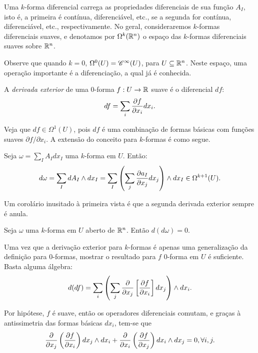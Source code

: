 Uma $k$-forma diferencial carrega as propriedades diferenciais de sua função $A_I$, isto é, a primeira é contínua, diferenciável, etc., se a segunda for contínua, diferenciável, etc., respectivamente. No geral, consideraremos $k$-formas diferenciais suaves, e denotamos por $\Omega^k(\mathbb{R}^n)$ o espaço das $k$-formas diferenciais suaves sobre $\mathbb{R}^n$.

Observe que quando $k=0$, $\Omega^0 (U) = {\mathscr{C}}^{\infty}(U)$, para $U \subseteq \mathbb{R}^n$. Neste espaço, uma operação importante é a diferenciação, a qual já é conhecida.

\begin{definition}
    A \textit{derivada exterior} de uma 0-forma $f: U \to \mathbb{R}$ suave é o diferencial $df$:
    \begin{equation*}
        df = \sum_i \dfrac{\partial f}{\partial x_i} dx_i.
    \end{equation*}
\end{definition}

Veja que $df \in \Omega^1(U)$, pois $df$ é uma combinação de formas básicas com funções suaves $\partial f / \partial x_i$. A extensão do conceito para $k$-formas é como segue.

\begin{definition}\label{def:derivada_exterior}
    Seja $\omega = \sum_I A_I dx_I$ uma $k$-forma em $U$. Então:
    \begin{equation*}
        d\omega = \sum_I dA_I \wedge dx_I
        = \sum_I \left(\sum_j \dfrac{\partial a_I}{\partial x_j} dx_j\right) \wedge dx_I
        \in \Omega^{k+1}(U).
    \end{equation*}
\end{definition}

Um corolário inusitado à primeira vista é que a segunda derivada exterior sempre é anula.

\begin{corollary}\label{cor:d2_0}
    Seja $\omega$ uma $k$-forma em $U$ aberto de $\mathbb{R}^n$. Então $d(d \omega) = 0$.
\end{corollary}
\begin{Proof}
    Uma vez que a derivação exterior para $k$-formas é apenas uma generalização da definição para $0$-formas, mostrar o resultado para $f$ 0-forma em $U$ é suficiente. Basta alguma álgebra:
    \begin{align*}
        d(df) = \sum_i \left( \sum_j \dfrac{\partial }{\partial x_j} \left[\dfrac{\partial f}{\partial x_i}\right] dx_j \right) \wedge dx_i.
    \end{align*}

    Por hipótese, $f$ é suave, então os operadores diferenciais comutam, e graças à antissimetria das formas básicas $dx_i$, tem-se que
    \begin{equation*}
        \dfrac{\partial }{\partial x_j} \left(\dfrac{\partial f}{\partial x_i}\right) dx_j \wedge dx_i
        +
        \dfrac{\partial }{\partial x_i} \left(\dfrac{\partial f}{\partial x_j}\right) dx_i \wedge dx_j
        = 0, \forall i, j.
    \end{equation*}
\end{Proof}

